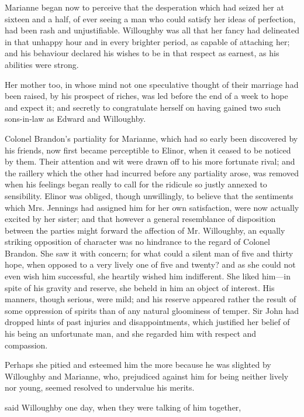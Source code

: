 Marianne began now to perceive that the desperation which had seized her at sixteen and a half, of ever seeing a man who could satisfy her ideas of perfection, had been rash and unjustifiable. Willoughby was all that her fancy had delineated in that unhappy hour and in every brighter period, as capable of attaching her; and his behaviour declared his wishes to be in that respect as earnest, as his abilities were strong.

Her mother too, in whose mind not one speculative thought of their marriage had been raised, by his prospect of riches, was led before the end of a week to hope and expect it; and secretly to congratulate herself on having gained two such sons-in-law as Edward and Willoughby.

Colonel Brandon's partiality for Marianne, which had so early been discovered by his friends, now first became perceptible to Elinor, when it ceased to be noticed by them. Their attention and wit were drawn off to his more fortunate rival; and the raillery which the other had incurred before any partiality arose, was removed when his feelings began really to call for the ridicule so justly annexed to sensibility. Elinor was obliged, though unwillingly, to believe that the sentiments which Mrs. Jennings had assigned him for her own satisfaction, were now actually excited by her sister; and that however a general resemblance of disposition between the parties might forward the affection of Mr. Willoughby, an equally striking opposition of character was no hindrance to the regard of Colonel Brandon. She saw it with concern; for what could a silent man of five and thirty hope, when opposed to a very lively one of five and twenty? and as she could not even wish him successful, she heartily wished him indifferent. She liked him---in spite of his gravity and reserve, she beheld in him an object of interest. His manners, though serious, were mild; and his reserve appeared rather the result of some oppression of spirits than of any natural gloominess of temper. Sir John had dropped hints of past injuries and disappointments, which justified her belief of his being an unfortunate man, and she regarded him with respect and compassion.

Perhaps she pitied and esteemed him the more because he was slighted by Willoughby and Marianne, who, prejudiced against him for being neither lively nor young, seemed resolved to undervalue his merits.

 said Willoughby one day, when they were talking of him together, 

